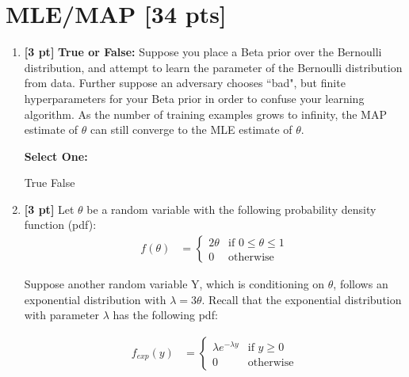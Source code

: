 \documentclass[12pt,addpoints,answers]{exam}
\begin{document}
\begin{enumerate}
    
    \clearpage
    
    
    
\end{enumerate}

\clearpage

\section{MLE/MAP [34 pts]}
\begin{enumerate}

    \item \textbf{[3 pt]} \textbf{True or False:} Suppose you place a Beta prior over the Bernoulli distribution, and attempt to learn the parameter of the Bernoulli distribution from data. Further suppose an adversary chooses ``bad", but finite hyperparameters for your Beta prior in order to confuse your learning algorithm. As the number of training examples grows to infinity, the MAP estimate of $\theta$ can still converge to the MLE estimate of $\theta$.
    
    \textbf{Select One:}
    
    \begin{checkboxes}
        \choice True
        \choice False
    \end{checkboxes}
    
    
    \item \textbf{[3 pt]} Let $\theta$ be a random variable with the following probability density function (pdf): 
    \begin{align*}
        f(\theta) &= 
        \begin{cases}
        2\theta  & \text{if } 0 \leq \theta \leq 1 \\
        0  & \text{otherwise}
        \end{cases}
    \end{align*}
    
    Suppose another random variable Y, which is conditioning on $\theta$, follows an exponential distribution with  $\lambda=3\theta$. Recall that the exponential distribution with parameter $\lambda$ has the following pdf:
    
    
    \begin{align*}
        f_{exp}(y) &= 
        \begin{cases}
        \lambda e^{-\lambda y}  & \text{if } y\geq 0 \\
        0  & \text{otherwise}
        \end{cases}
    \end{align*}
    

\end{enumerate}
\end{document}
